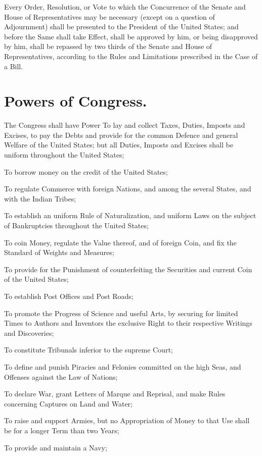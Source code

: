 \documentclass[12pt]{constitution}
\begin{document}
Every Order, Resolution, or Vote to which the Concurrence of the Senate and
House of Representatives may be necessary (except on a question of Adjournment)
shall be presented to the President of the United States; and before the Same
shall take Effect, shall be approved by him, or being disapproved by him, shall
be repassed by two thirds of the Senate and House of Representatives, according
to the Rules and Limitations prescribed in the Case of a Bill.


\section{Powers of Congress.}
The Congress shall have Power To lay and collect Taxes, Duties, Imposts and
Excises, to pay the Debts and provide for the common Defence and general
Welfare of the United States; but all Duties, Imposts and Excises shall be
uniform throughout the United States;

To borrow money on the credit of the United States;

To regulate Commerce with foreign Nations, and among the several States, and
with the Indian Tribes;

To establish an uniform Rule of Naturalization, and uniform Laws on the subject
of Bankruptcies throughout the United States;

To coin Money, regulate the Value thereof, and of foreign Coin, and fix the
Standard of Weights and Measures;

To provide for the Punishment of counterfeiting the Securities and current Coin
of the United States;

To establish Post Offices and Post Roads;

To promote the Progress of Science and useful Arts, by securing for limited
Times to Authors and Inventors the exclusive Right to their respective Writings
and Discoveries;

To constitute Tribunals inferior to the supreme Court;

To define and punish Piracies and Felonies committed on the high Seas, and
Offenses against the Law of Nations;

To declare War, grant Letters of Marque and Reprisal, and make Rules concerning
Captures on Land and Water;

To raise and support Armies, but no Appropriation of Money to that Use shall be
for a longer Term than two Years;

To provide and maintain a Navy;
\end{document}
